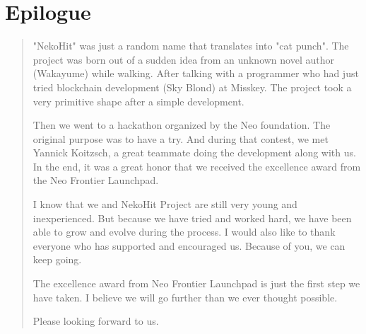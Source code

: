 \documentclass[12pt,a4paper]{article}
\begin{document}
    \section{Epilogue}\label{sec:end}

    \begin{quotation}
        "NekoHit" was just a random name that translates into "cat punch".
        The project was born out of a sudden idea from an unknown novel author
        (Wakayume) while walking.
        After talking with a programmer who had just tried blockchain development
        (Sky Blond) at Misskey.
        The project took a very primitive shape after a simple development.

        Then we went to a hackathon organized by the Neo foundation.
        The original purpose was to have a try.
        And during that contest, we met Yannick Koitzsch, a great teammate doing
        the development along with us.
        In the end, it was a great honor that we received the excellence award
        from the Neo Frontier Launchpad.

        I know that we and NekoHit Project are still very young and inexperienced.
        But because we have tried and worked hard, we have been able to grow and
        evolve during the process.
        I would also like to thank everyone who has supported and encouraged us.
        Because of you, we can keep going.

        The excellence award from Neo Frontier Launchpad is just the first step
        we have taken.
        I believe we will go further than we ever thought possible.

        Please looking forward to us.

    \end{quotation}

    \clearpage

    
    
\end{document}
